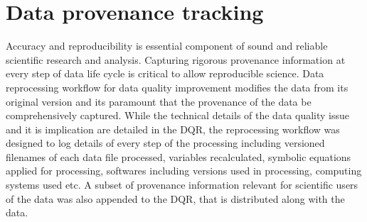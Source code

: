 \section{Data provenance tracking}
Accuracy and reproducibility is essential component of sound and
reliable scientific research and analysis. Capturing rigorous provenance
information at every step of data life cycle is critical to allow
reproducible science. Data reprocessing workflow for data quality
improvement modifies the data from its original version and its
paramount that the provenance of the data be comprehensively captured.
While the technical details of the data quality issue and it is
implication are detailed in the DQR, the reprocessing workflow was
designed to log details of every step of the processing including
versioned filenames of each data file processed, variables recalculated,
symbolic equations applied for processing, softwares including versions
used in processing, computing systems used etc. A subset of provenance
information relevant for scientific users of the data was also appended
to the DQR, that is distributed along with the data. 

